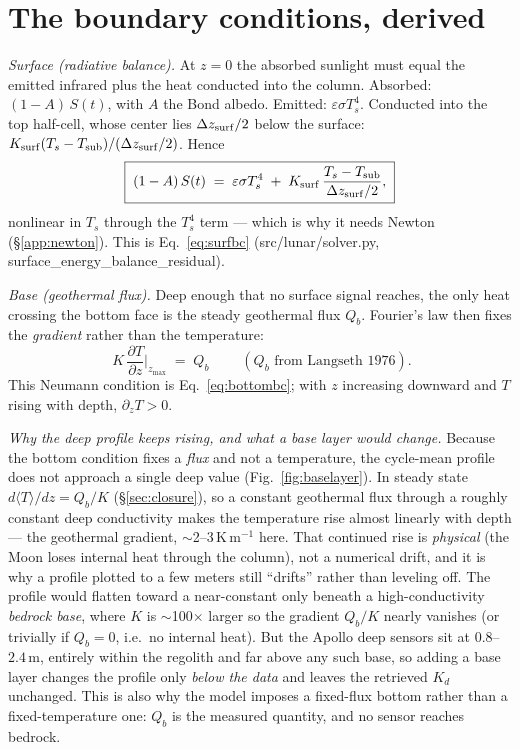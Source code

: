 \documentclass[11pt]{report}
\newcommand{\code}[1]{{\ttfamily\small #1}}
\begin{document}
\section{The boundary conditions, derived}\label{app:bc}
\emph{Surface (radiative balance).} At $z=0$ the absorbed sunlight must equal the
emitted infrared plus the heat conducted into the column. Absorbed:
$(1-A)\,S(t)$, with $A$ the Bond albedo. Emitted: $\varepsilon\sigma T_s^4$.
Conducted into the top half-cell, whose center lies $\Delta z_{\rm surf}/2$ below
the surface: $K_{\rm surf}(T_s-T_{\rm sub})/(\Delta z_{\rm surf}/2)$. Hence
\[
\boxed{\;(1-A)\,S(t) \;=\; \varepsilon\sigma T_s^4
\;+\; K_{\rm surf}\,\frac{T_s-T_{\rm sub}}{\Delta z_{\rm surf}/2},\;}
\]
nonlinear in $T_s$ through the $T_s^4$ term --- which is why it needs Newton
(\S\ref{app:newton}). This is Eq.~\eqref{eq:surfbc}
(\code{src/lunar/solver.py}, \code{surface\_energy\_balance\_residual}).

\emph{Base (geothermal flux).} Deep enough that no surface signal reaches, the
only heat crossing the bottom face is the steady geothermal flux $Q_b$. Fourier's
law then fixes the \emph{gradient} rather than the temperature:
\[
\boxed{\;K\,\frac{\partial T}{\partial z}\bigg|_{z_{\max}} \;=\; Q_b\;}
\qquad(Q_b\text{ from Langseth 1976}).
\]
This Neumann condition is Eq.~\eqref{eq:bottombc}; with $z$ increasing downward
and $T$ rising with depth, $\partial_z T>0$.

\emph{Why the deep profile keeps rising, and what a base layer would change.}
Because the bottom condition fixes a \emph{flux} and not a temperature, the
cycle-mean profile does not approach a single deep value (Fig.~\ref{fig:baselayer}).
In steady state
$d\langle T\rangle/dz = Q_b/K$ (\S\ref{sec:closure}), so a constant geothermal
flux through a roughly constant deep conductivity makes the temperature rise
almost linearly with depth --- the geothermal gradient, $\sim$2--3\,K\,m$^{-1}$
here. That continued rise is \emph{physical} (the Moon loses internal heat
through the column), not a numerical drift, and it is why a profile plotted to a
few meters still ``drifts'' rather than leveling off. The profile would flatten
toward a near-constant only beneath a high-conductivity \emph{bedrock base},
where $K$ is $\sim$100$\times$ larger so the gradient $Q_b/K$ nearly vanishes
(or trivially if $Q_b=0$, i.e.\ no internal heat). But the Apollo deep sensors
sit at $0.8$--$2.4$\,m, entirely within the regolith and far above any such
base, so adding a base layer changes the profile only \emph{below the data} and
leaves the retrieved $K_d$ unchanged. This is also why the model imposes a
fixed-flux bottom rather than a fixed-temperature one: $Q_b$ is the measured
quantity, and no sensor reaches bedrock.
\end{document}
